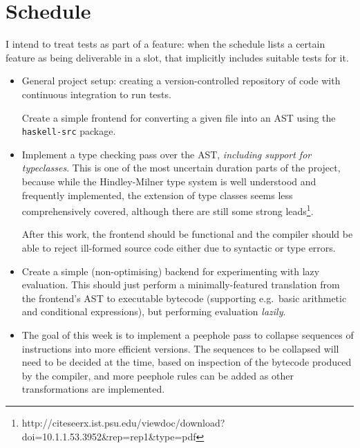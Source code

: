 \documentclass[12pt]{article}
\newcommand\monospace[1]{\texttt{#1}}
\begin{document}
\section*{Schedule}

I intend to treat tests as part of a feature: when the schedule lists a certain feature as being deliverable in a slot,
that implicitly includes suitable tests for it.




\begin{itemize}
\item
{

    General project setup: creating a version-controlled repository of code with continuous integration to run tests.

    Create a simple frontend for converting a given file into an AST using the \monospace{haskell-src} package.
}
\item
{

    Implement a type checking pass over the AST, \textit{including support for typeclasses}. This is one of the most
    uncertain duration parts of the project, because while the Hindley-Milner type system is well understood and
    frequently implemented, the extension of type classes seems less comprehensively covered, although there are still
    some strong leads\footnote{http://citeseerx.ist.psu.edu/viewdoc/download?doi=10.1.1.53.3952\&rep=rep1\&type=pdf}.

    After this work, the frontend should be functional and the compiler should be able to reject ill-formed
    source code either due to syntactic or type errors.
}
\item
{

    Create a simple (non-optimising) backend for experimenting with lazy evaluation. This should just perform a
    minimally-featured translation from the frontend's AST to executable bytecode (supporting e.g.\ basic arithmetic and
    conditional expressions), but performing evaluation \textit{lazily}.
}
\item
{

    The goal of this week is to implement a peephole pass to collapse sequences of instructions into more efficient
    versions. The sequences to be collapsed will need to be decided at the time, based on inspection of the bytecode
    produced by the compiler, and more peephole rules can be added as other transformations are implemented.
    
}
\end{itemize}
\end{document}
